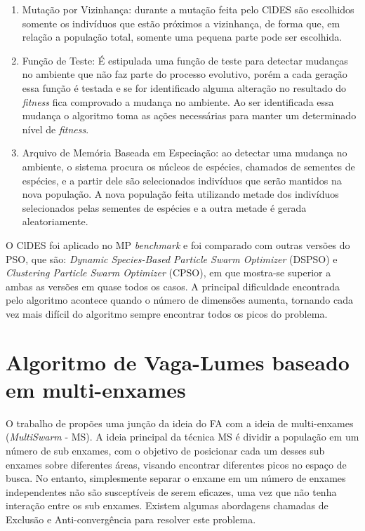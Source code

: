 \begin{enumerate}
\item Mutação por Vizinhança: durante a mutação feita pelo ClDES são escolhidos somente os indivíduos que estão próximos a vizinhança, de forma que, em relação a população total, somente uma pequena parte pode ser escolhida.

\item Função de Teste: É estipulada uma função de teste para detectar mudanças no ambiente que não faz parte do processo evolutivo, porém a cada geração essa função é testada e se for identificado alguma alteração no resultado do \textit{fitness} fica comprovado a mudança no ambiente. Ao ser identificada essa mudança o algoritmo toma as ações necessárias para manter um determinado nível de \textit{fitness}.

\item Arquivo de Memória Baseada em Especiação: ao detectar uma mudança no ambiente, o sistema procura os núcleos de espécies, chamados de sementes de espécies, e a partir dele são selecionados indivíduos que serão mantidos na nova população. A nova população feita utilizando metade dos indivíduos selecionados pelas sementes de espécies e a outra metade é gerada aleatoriamente.
\end{enumerate}

O ClDES foi aplicado no MP \textit{benchmark} e foi comparado com outras versões do PSO, que são: \textit{Dynamic Species-Based Particle Swarm Optimizer} (DSPSO) e \textit{Clustering Particle Swarm Optimizer} (CPSO), em que mostra-se superior a ambas as versões em quase todos os casos. A principal dificuldade encontrada pelo algoritmo acontece quando o número de dimensões aumenta, tornando cada vez mais difícil do algoritmo sempre encontrar todos os picos do problema.

\section{Algoritmo de Vaga-Lumes baseado em multi-enxames}
\label{sec:fa_behaviour}

O trabalho de \cite{farahani2011multiswarm} propões uma junção da ideia do FA com a ideia de multi-enxames (\textit{MultiSwarm} - MS). A ideia principal da técnica MS é dividir a população em um número de sub enxames, com o objetivo de posicionar cada um desses sub enxames sobre diferentes áreas, visando encontrar diferentes picos no espaço de busca. No entanto, simplesmente separar o enxame em um número de enxames independentes não são susceptíveis de serem eficazes, uma vez que não tenha interação entre os sub enxames. Existem algumas abordagens chamadas de Exclusão e Anti-convergência para resolver este problema.

